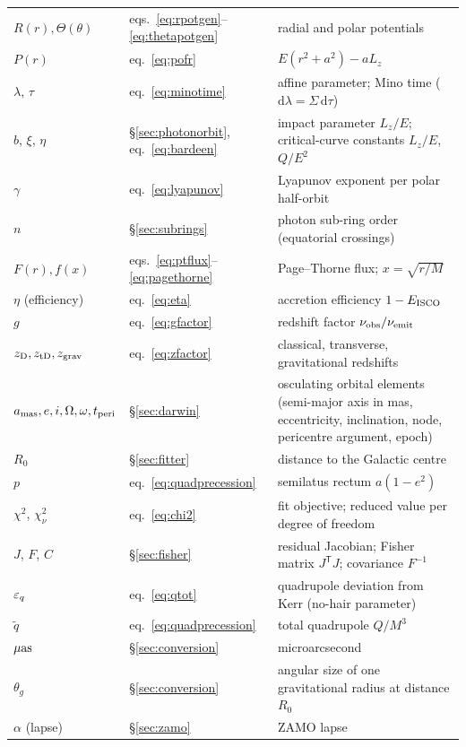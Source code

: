 \begin{longtable}{llp{}}
$R(r), \Theta(\theta)$ & eqs.~\eqref{eq:rpotgen}--\eqref{eq:thetapotgen}
& radial and polar potentials \\
$P(r)$ & eq.~\eqref{eq:pofr} & $E(r^2+a^2) - aL_z$ \\
$\lambda$, $\tau$ & eq.~\eqref{eq:minotime} & affine parameter; Mino
time ($\mathrm{d}\lambda = \Sigma\,\mathrm{d}\tau$) \\
$b$, $\xi$, $\eta$ & \S\ref{sec:photonorbit}, eq.~\eqref{eq:bardeen} &
impact parameter $L_z/E$; critical-curve constants $L_z/E$, $Q/E^2$ \\
$\gamma$ & eq.~\eqref{eq:lyapunov} & Lyapunov exponent per polar
half-orbit \\
$n$ & \S\ref{sec:subrings} & photon sub-ring order (equatorial
crossings) \\
$F(r), f(x)$ & eqs.~\eqref{eq:ptflux}--\eqref{eq:pagethorne} &
Page--Thorne flux; $x = \sqrt{r/M}$ \\
$\eta$ (efficiency) & eq.~\eqref{eq:eta} & accretion efficiency
$1 - E_{\rm ISCO}$ \\
$g$ & eq.~\eqref{eq:gfactor} & redshift factor
$\nu_{\rm obs}/\nu_{\rm emit}$ \\
$z_{\rm D}, z_{\rm tD}, z_{\rm grav}$ & eq.~\eqref{eq:zfactor} &
classical, transverse, gravitational redshifts \\
$a_{\rm mas}, e, i, \Omega, \omega, t_{\rm peri}$ &
\S\ref{sec:darwin} & osculating orbital elements (semi-major axis in
mas, eccentricity, inclination, node, pericentre argument, epoch) \\
$R_0$ & \S\ref{sec:fitter} & distance to the Galactic centre \\
$p$ & eq.~\eqref{eq:quadprecession} & semilatus rectum $a(1-e^2)$ \\
$\chi^2$, $\chi^2_\nu$ & eq.~\eqref{eq:chi2} & fit objective; reduced
value per degree of freedom \\
$J$, $F$, $C$ & \S\ref{sec:fisher} & residual Jacobian; Fisher matrix
$J^{\mathsf T}J$; covariance $F^{-1}$ \\
$\varepsilon_q$ & eq.~\eqref{eq:qtot} & quadrupole deviation from Kerr
(no-hair parameter) \\
$\tilde q$ & eq.~\eqref{eq:quadprecession} & total quadrupole $Q/M^3$ \\
$\mu\mathrm{as}$ & \S\ref{sec:conversion} & microarcsecond \\
$\theta_g$ & \S\ref{sec:conversion} & angular size of one gravitational
radius at distance $R_0$ \\
$\alpha$ (lapse) & \S\ref{sec:zamo} & ZAMO lapse

\end{longtable}
